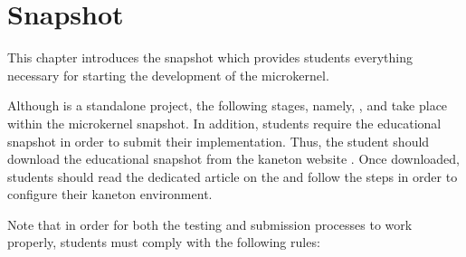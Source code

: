 %
%
%
%
%
%

%
%

\chapter{Snapshot}
\label{chapter:snapshot}

This chapter introduces the snapshot which provides students everything
necessary for starting the development of the  microkernel.

\newpage

%
%

Although  is a standalone project, the following stages, namely,
,  and  take place within the microkernel snapshot.
In addition, students require the educational snapshot in order to submit
their implementation. Thus, the student should download the educational
snapshot from the kaneton website . Once
downloaded, students should read the dedicated article on the 
 and follow the steps in order to configure their kaneton
environment.

Note that in order for both the testing and submission processes to work
properly, students must comply with the following rules:

